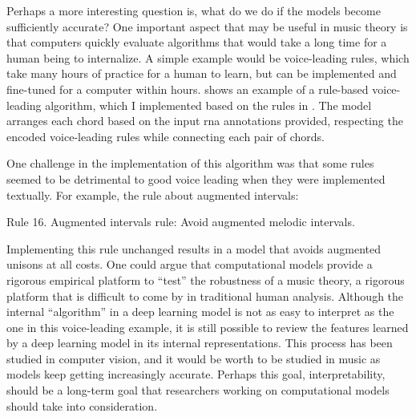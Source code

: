 

Perhaps a more interesting question is, what do we do if the
models become sufficiently accurate? One important aspect
that may be useful in music theory is that computers quickly
evaluate algorithms that would take a long time for a human
being to internalize. A simple example would be
voice-leading rules, which take many hours of practice for a
human to learn, but can be implemented and fine-tuned for a
computer within hours.  shows an
example of a rule-based voice-leading algorithm, which I
implemented based on the rules in
\textcite[p.~10]{huron2016voice}.
The model arranges each chord based on the input \gls{rna}
annotations provided, respecting the encoded voice-leading
rules while connecting each pair of chords. 


One challenge in the implementation of this algorithm was
that some rules seemed to be detrimental to good voice
leading when they were implemented textually. For example,
the rule about augmented intervals:

\begin{italicquotes}
    Rule 16. Augmented intervals rule: Avoid augmented
    melodic intervals.
\end{italicquotes}

Implementing this rule unchanged results in a model that
avoids augmented unisons at all costs. One could argue that
computational models provide a rigorous empirical platform
to ``test'' the robustness of a music theory, a rigorous
platform that is difficult to come by in traditional human
analysis. Although the internal ``algorithm'' in a deep
learning model is not as easy to interpret as the one in
this voice-leading example, it is still possible to review
the features learned by a deep learning model in its
internal representations. This process has been studied in
computer vision, and it would be worth to be studied in
music as models keep getting increasingly accurate. Perhaps
this goal, interpretability, should be a long-term goal that
researchers working on computational models should take into
consideration.
